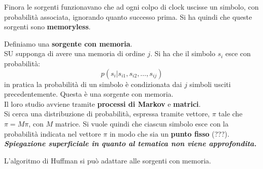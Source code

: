 \documentclass[a4paper,12pt, oneside]{book}
\begin{document}
Finora le sorgenti funzionavano che ad ogni colpo di clock uscisse un simbolo,
con probabilità associata, ignorando quanto successo prima. Si ha quindi che
queste sorgenti sono \textbf{memoryless}. 
\begin{definizione}
  Definiamo una \textbf{sorgente con memoria}.\\
  SU supponga di avere una memoria di ordine $j$. Si ha che il simbolo $s_i$
  esce con probabilità:
  \[p(s_i|s_{i1},s_{i2},\ldots,s_{ij})\]
  in pratica la probabilità di un simbolo è condizionata dai $j$ simboli usciti
  precedentemente. Questa è una sorgente con memoria.\\
  Il loro studio avviene tramite \textbf{processi di Markov} e
  \textbf{matrici}.\\
  Si cerca una distribuzione di probabilità, espressa tramite vettore, $\pi$
  tale che $\pi=M\pi$, con $M$ matrice. Si vuole quindi che ciascun simbolo esce
  con la probabilità indicata nel vettore $\pi$ in modo che sia un \textbf{punto
    fisso} (???). \\
  \textbf{\textit{Spiegazione superficiale in quanto al tematica non viene
      approfondita.}} 
\end{definizione}
L'algoritmo di Huffman si può adattare alle sorgenti con memoria.
\end{document}
